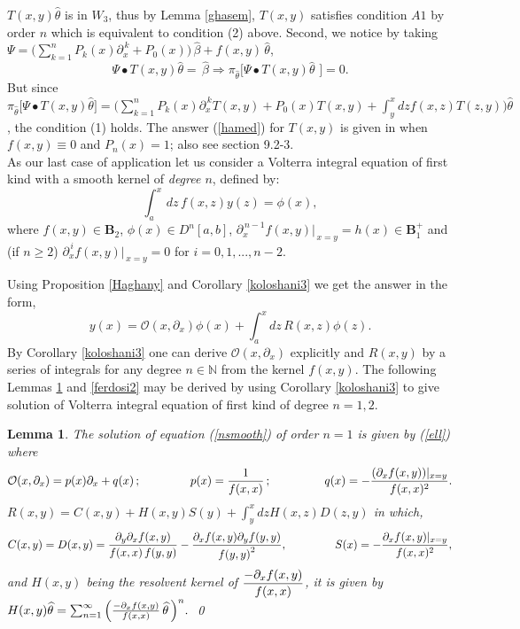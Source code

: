 \documentclass[10pt]{article}
\newcommand{\be}{\begin{equation}}
\newcommand{\ee}{\end{equation}}
\newcommand{\nn}{\nonumber}
\newcommand{\rd}{\partial}
\newcommand{\PP}{\boldsymbol{B}^{+}_1}
\newcommand{\Na}{{\mathbb N}}
\newtheorem{lem}{Lemma}
\begin{document}
{{$T(x,y)\widehat{\theta}$ is in $W_3$, thus by Lemma \ref{ghasem},
$T(x,y)$ satisfies condition $A{1}$ by order $n$ which is equivalent
to condition (2) above. Second, we notice by taking
$\Psi=\big(\sum^{n}_{k=1} P_{k}(x)
\rd_{x}^{\,k}+P_{0}(x)\big){\,\widehat{\beta}}+f(x,y){\,\widehat{\theta}}$,
\be\Psi\bullet
T(x,y)\widehat{\theta}={\,\widehat{\beta}}\Longrightarrow
{\pi}_{\widehat{\theta}}\big[\Psi\bullet
T(x,y)\widehat{\theta}\,\,\big]=0.\nn \ee But since
${\pi}_{\widehat{\theta}}\big[\Psi\bullet
T(x,y)\widehat{\theta}\big]=\big(\sum^{n}_{k=1} P_{k}(x)
\rd_{x}^{\,k}T(x,y)+P_{0}(x)T(x,y)+\int^{x}_{y}dz
f(x,z)T(z,y)\Big)\widehat{\theta}$, the condition (1) holds. The
answer (\ref{hamed}) for $T(x,y)$ is given in \cite{ad} when
$f(x,y)\equiv 0$ and $P_{n}(x)=1$; also see \cite{polyan} section
9.2-3.\\

As our last case of application let us consider a Volterra integral
equation of first kind with a smooth kernel of {\em degree $n$},
defined by: \be\int^{x}_{a}\, dz\,f(x,z)
y(z)=\phi(x)\label{nsmooth},\ee where $f(x,y)\in {\boldsymbol B_2}$,
$\phi(x)\in D^{n}[a,b]$, $\rd^{\,n-1}_{x}f(x,y)|_{\,x=y}=h(x)\in\PP$
and (if $n\geq 2$) $\rd^{\,i}_{x}f(x,y)|_{\,x=y}=0$ for
$i=0,1,...,n-2$.

Using Proposition \ref{Haghany}  and Corollary \ref{koloshani3} we
get the answer in the form, \be y(x)=\mathcal{O}(x,\rd_{x})\phi(x)+
 \int^{x}_{a} dz \,R(x,z) \phi(z).\label{ell}\ee By Corollary \ref{koloshani3} one can derive
$\mathcal{O}(x,\rd_{x})$ explicitly and $R(x,y)$ by a series of
integrals for any degree $n\in \Na$ from the kernel $f(x,y)$. The
following Lemmas \ref{ferdosi1} and \ref{ferdosi2} may be derived by
using Corollary \ref{koloshani3} to give solution of Volterra
integral equation of first kind of degree $n=1,2$.
\begin{lem}\label{ferdosi1}{The solution of equation (\ref{nsmooth}) of order $n=1$
is given by (\ref{ell}) where \be
\mathcal{O}(x,\rd_{x})=p(x)\rd_{x}+q(x)\,;\hspace{1.5cm}
p(x)={1\over f(x,x)}\,;\,\, \hspace{1.5cm}
q(x)=-{(\rd_{x}{f(x,y)})|_{x=y} \over f(x,x)^2}.\nn\ee
$\displaystyle R(x,y)=C(x,y)+H(x,y) S(y)+\int^{x}_{y} dz
H(x,z)D(z,y)$ \hspace{0.1cm} in which,\be
C(x,y)=D(x,y)={{\rd_{y}\rd_{x} f(x,y)}\over{f(x,x)\,
f(y,y)}}-{{\rd_{x} f(x,y)\rd_{y} f(y,y)}\over{f(y,y)}^2},
\hspace{1.5cm} S(x)=-{\rd_{x} f(x,y)|_{x=y}\over f(x,x)^2},
\label{frds5}\nn\ee and $H(x,y)$ being the resolvent kernel of
$\displaystyle{-\rd_{x} f(x,y)\over f(x,x)}$, it is given by $
H(x,y)\widehat{\theta}=\sum^{\infty}_{n=1}\Big({-\rd_{x} f(x,y)\over
f(x,x)}\,\widehat{\theta}\,\Big)^{n}.$ \qed}
\end{lem}

}}
\end{document}
